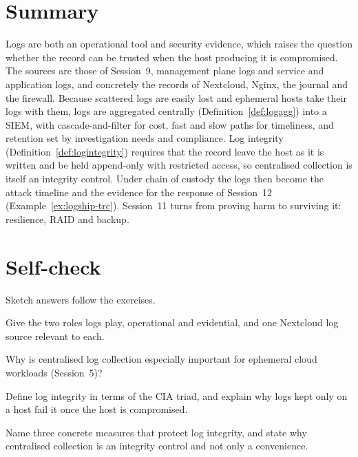 \section{Summary}

Logs are both an operational tool and security evidence, which raises the
question whether the record can be trusted when the host producing it is
compromised. The sources are those of Session~9, management plane logs and
service and application logs, and concretely the records of Nextcloud,
Nginx, the journal and the firewall. Because scattered logs are easily lost
and ephemeral hosts take their logs with them, logs are aggregated centrally
(Definition~\ref{def:logagg}) into a SIEM, with cascade-and-filter for cost,
fast and slow paths for timeliness, and retention set by investigation needs
and compliance. Log integrity (Definition~\ref{def:logintegrity}) requires
that the record leave the host as it is written and be held append-only with
restricted access, so centralised collection is itself an integrity control.
Under chain of custody the logs then become the attack timeline and the
evidence for the response of Session~12 (Example~\ref{ex:logship-trc}).
Session~11 turns from proving harm to surviving it: resilience, RAID and
backup.

\section*{Self-check}

Sketch answers follow the exercises.

\begin{exercise}
Give the two roles logs play, operational and evidential, and one Nextcloud
log source relevant to each.
\end{exercise}

\begin{exercise}
Why is centralised log collection especially important for ephemeral cloud
workloads (Session~5)?
\end{exercise}

\begin{exercise}
Define log integrity in terms of the CIA triad, and explain why logs kept
only on a host fail it once the host is compromised.
\end{exercise}

\begin{exercise}
Name three concrete measures that protect log integrity, and state why
centralised collection is an integrity control and not only a convenience.
\end{exercise}


